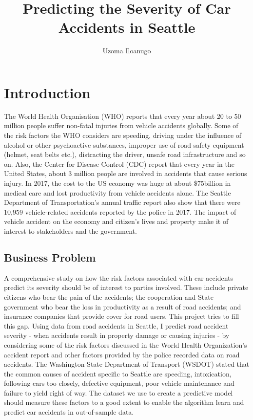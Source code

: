 \documentclass[a4paper,12pt]{article}
\author{Uzoma Iloanugo}
\title{Predicting the Severity of Car Accidents in Seattle}
\begin{document}
\maketitle

\section{Introduction}
The World Health Organisation (WHO) reports that every year about 20 to 50 million people suffer non-fatal injuries from vehicle accidents globally. Some of the risk factors the WHO considers are speeding, driving under the influence of alcohol or other psychoactive substances, improper use of road safety equipment (helmet, seat belts etc.), distracting the driver, unsafe road infrastructure and so on. Also, the Center for Disease Control (CDC) report that every year in the United States, about 3 million people are involved in accidents that cause serious injury. In 2017, the cost to the US economy was huge at about \$75billion in medical care and lost productivity from vehicle accidents alone. The Seattle Department of Transportation’s annual traffic report also show that there were 10,959 vehicle-related accidents reported by the police in 2017. The impact of vehicle accident on the economy and citizen's lives and property make it of interest to stakeholders and the government.

\subsection{Business Problem}
A comprehensive study on how the risk factors associated with car accidents predict its severity should be of interest to parties involved. These include private citizens who bear the pain of the accidents; the cooperation and State government who bear the loss in productivity as a result of road accidents; and insurance companies that provide cover for road users. This project tries to fill this gap. Using data from road accidents in Seattle, I predict road accident severity - when accidents result in property damage or causing injuries - by considering some of the risk factors discussed in the World Health Organization's accident report and other factors provided by the police recorded data on road accidents. The Washington State Department of Transport (WSDOT) stated that the common causes of accident specific to Seattle are speeding, intoxication, following cars too closely, defective equipment, poor vehicle maintenance and failure to yield right of way. The dataset we use to create a predictive model should measure these factors to a good extent to enable the algorithm learn and predict car accidents in out-of-sample data.\\
\end{document}
